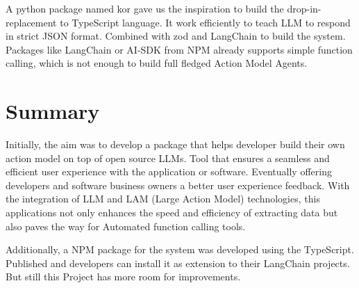 \noindent A python package named kor gave us the inspiration to build the drop-in-replacement to TypeScript language. It work efficiently to teach LLM to respond in strict JSON format. Combined with zod and LangChain to build the system. Packages like LangChain or AI-SDK from NPM already supports simple function calling, which is not enough to build full fledged Action Model Agents.

\section{Summary}

\noindent 
Initially, the aim was to develop a package that helps developer build their own action model on top of open source LLMs. Tool that ensures a seamless and efficient user experience with the application or software. Eventually offering developers and software business owners a better user experience feedback. With the integration of LLM and LAM (Large Action Model) technologies, this applications not only enhances the speed and efficiency of extracting data but also paves the way for Automated function calling tools.

\noindent
Additionally, a NPM package for the system was developed using the TypeScript. Published and developers can install it as extension to their LangChain projects. But still this Project has more room for improvements.
